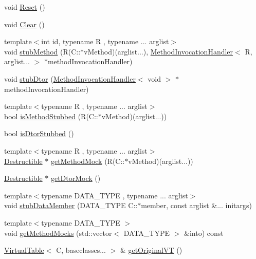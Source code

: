 \begin{DoxyCompactItemize}
void \mbox{\hyperlink{structfakeit_1_1DynamicProxy_a8f00dd7c68a247f715ec3925f662de9f}{Reset}} ()
\item 
void \mbox{\hyperlink{structfakeit_1_1DynamicProxy_a995c7e3dd97dc7707f18774eb4554b45}{Clear}} ()
\item 
{\footnotesize template$<$int id, typename R , typename ... arglist$>$ }\\void \mbox{\hyperlink{structfakeit_1_1DynamicProxy_ab1a98295698cf6eed3ff04ed4b838e51}{stub\+Method}} (R(C\+::$\ast$v\+Method)(arglist...), \mbox{\hyperlink{structfakeit_1_1MethodInvocationHandler}{Method\+Invocation\+Handler}}$<$ R, arglist... $>$ $\ast$method\+Invocation\+Handler)
\item 
void \mbox{\hyperlink{structfakeit_1_1DynamicProxy_a8ab5aa831398c6ee27cbdb12ee1f15cf}{stub\+Dtor}} (\mbox{\hyperlink{structfakeit_1_1MethodInvocationHandler}{Method\+Invocation\+Handler}}$<$ void $>$ $\ast$method\+Invocation\+Handler)
\item 
{\footnotesize template$<$typename R , typename ... arglist$>$ }\\bool \mbox{\hyperlink{structfakeit_1_1DynamicProxy_aeccdd2a03ebbf8eecc3291ebe6ccbfc4}{is\+Method\+Stubbed}} (R(C\+::$\ast$v\+Method)(arglist...))
\item 
bool \mbox{\hyperlink{structfakeit_1_1DynamicProxy_a6d3f0dfa93dc98b37fb50002bc4ea2bc}{is\+Dtor\+Stubbed}} ()
\item 
{\footnotesize template$<$typename R , typename ... arglist$>$ }\\\mbox{\hyperlink{classfakeit_1_1Destructible}{Destructible}} $\ast$ \mbox{\hyperlink{structfakeit_1_1DynamicProxy_a9774578f92b4d0258c72192dd16d6d0e}{get\+Method\+Mock}} (R(C\+::$\ast$v\+Method)(arglist...))
\item 
\mbox{\hyperlink{classfakeit_1_1Destructible}{Destructible}} $\ast$ \mbox{\hyperlink{structfakeit_1_1DynamicProxy_a32f8a09734ef6d70162d682fd593707b}{get\+Dtor\+Mock}} ()
\item 
{\footnotesize template$<$typename D\+A\+T\+A\+\_\+\+T\+Y\+PE , typename ... arglist$>$ }\\void \mbox{\hyperlink{structfakeit_1_1DynamicProxy_a872480e95dba48c6e690fb7cdc017f9d}{stub\+Data\+Member}} (D\+A\+T\+A\+\_\+\+T\+Y\+PE C\+::$\ast$member, const arglist \&... initargs)
\item 
{\footnotesize template$<$typename D\+A\+T\+A\+\_\+\+T\+Y\+PE $>$ }\\void \mbox{\hyperlink{structfakeit_1_1DynamicProxy_a21e8fdd6bcf64b2d7e0b86261529da35}{get\+Method\+Mocks}} (std\+::vector$<$ D\+A\+T\+A\+\_\+\+T\+Y\+PE $>$ \&into) const
\item 
\mbox{\hyperlink{structfakeit_1_1VirtualTable}{Virtual\+Table}}$<$ C, baseclasses... $>$ \& \mbox{\hyperlink{structfakeit_1_1DynamicProxy_aa34a496518156007196fd405dbf2e058}{get\+Original\+VT}} ()
\end{DoxyCompactItemize}


